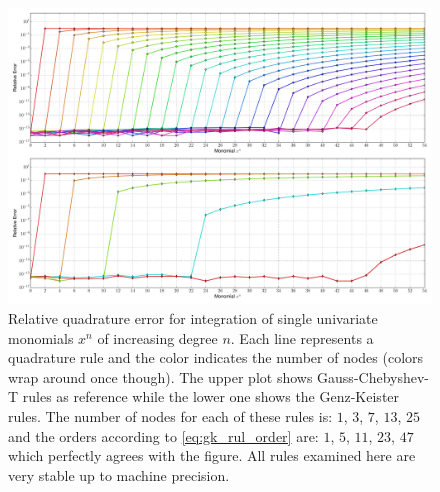 \documentclass[a4paper,10pt]{article}
\begin{document}
\clearpage

\begin{figure}
  \centering
  \includegraphics[width=\linewidth]{./img/monomial_errors_chebyshevt.pdf}
  \caption{Relative quadrature error for integration of single univariate monomials $x^n$ of increasing degree $n$.
  Each line represents a quadrature rule and the color indicates the number of nodes (colors wrap around once though).
  The upper plot shows Gauss-Chebyshev-T rules as reference while the lower one shows the Genz-Keister rules.
  The number of nodes for each of these rules is:
  $1$, $3$,  $7$, $13$, $25$ and the orders according to \eqref{eq:gk_rul_order} are:
  $1$, $5$, $11$, $23$, $47$ which perfectly agrees with the figure.
  All rules examined here are very stable up to machine precision.}
  \label{fig:monomial_errors_chebyshevt}
\end{figure}
\end{document}
